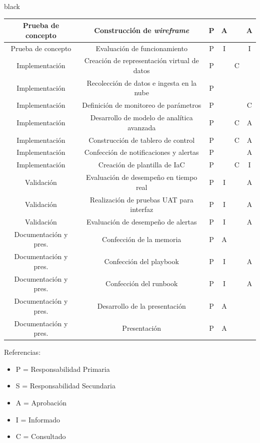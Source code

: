 \documentclass[11pt]{charter}
\begin{document}
\begin{consigna}{black}
\begin{table}[htpb]
{\begin{tabular}{|c|c|c|c|c|c|}
Prueba de concepto & Construcción de \textit{wireframe} & P & A &  & A  \\ \hline
Prueba de concepto & Evaluación de funcionamiento & P & I &  & I \\ \hline
Implementación & Creación de representación virtual de datos &  P & & C &  \\ \hline
Implementación & Recolección de datos e ingesta en la nube & P &  &  &  \\ \hline
Implementación & Definición de monitoreo de parámetros & P &  & & C  \\ \hline
Implementación & Desarrollo de modelo de analítica avanzada & P &  & C & A  \\ \hline
Implementación & Construcción de tablero de control & P & & C & A \\ \hline
Implementación & Confección de notificaciones y alertas & P & &  & A \\ \hline
Implementación & Creación de plantilla de IaC & P & & C & I \\ \hline
Validación & Evaluación de desempeño en tiempo real & P & I & & A \\ \hline
Validación & Realización de pruebas UAT para interfaz & P & I & & A \\ \hline
Validación & Evaluación de desempeño de alertas & P & I &  & A \\ \hline
Documentación y pres. & Confección de la memoria & P & A &  &  \\ \hline
Documentación y pres.& Confección del playbook & P & I &  & A \\ \hline 
Documentación y pres.& Confección del runbook & P & I & & A \\ \hline
Documentación y pres.& Desarrollo de la presentación & P & A & &  \\ \hline
Documentación y pres.& Presentación & P & A &  & \\ \hline
\end{tabular}%
}
\end{table}


{\footnotesize
Referencias:
\begin{itemize}
	\item P = Responsabilidad Primaria
	\item S = Responsabilidad Secundaria
	\item A = Aprobación
	\item I = Informado
	\item C = Consultado
\end{itemize}
} %


\end{consigna}
\end{document}

